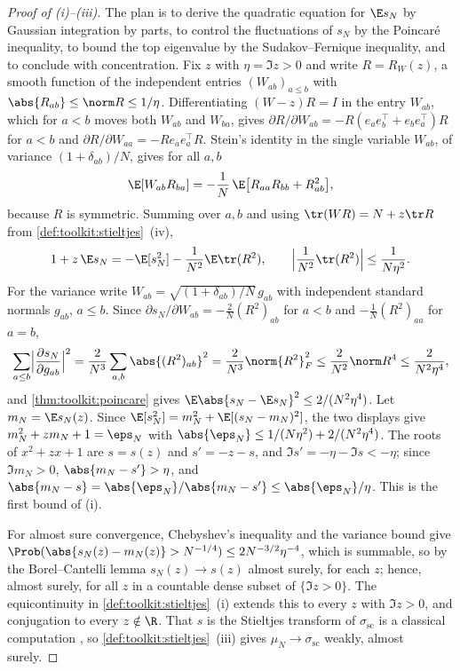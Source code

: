 \begin{refsection}
\begin{proof}[Proof of (i)--(iii)]
The plan is to derive the quadratic equation for $\E s_N$ by Gaussian integration by parts, to control the fluctuations of $s_N$ by the Poincaré inequality, to bound the top eigenvalue by the Sudakov--Fernique inequality, and to conclude with concentration. Fix $z$ with $\eta=\Im z>0$ and write $R=R_W(z)$, a smooth function of the independent entries $(W_{ab})_{a\le b}$ with $\abs{R_{ab}}\le\norm R\le1/\eta$. Differentiating $(W-z)R=I$ in the entry $W_{ab}$, which for $a<b$ moves both $W_{ab}$ and $W_{ba}$, gives $\partial R/\partial W_{ab}=-R(e_ae_b^\top+e_be_a^\top)R$ for $a<b$ and $\partial R/\partial W_{aa}=-Re_ae_a^\top R$. Stein's identity in the single variable $W_{ab}$, of variance $(1+\delta_{ab})/N$, gives for all $a,b$
\[
\E[W_{ab}R_{ba}]=-\frac1N\,\E\bigl[R_{aa}R_{bb}+R_{ab}^2\bigr],
\]
because $R$ is symmetric. Summing over $a,b$ and using $\tr(WR)=N+z\tr R$ from \cref{def:toolkit:stieltjes}~(iv),
\[
1+z\,\E s_N=-\E[s_N^2]-\frac1{N^2}\E\tr(R^2),\qquad\Bigl\lvert\frac1{N^2}\tr(R^2)\Bigr\rvert\le\frac1{N\eta^2}.
\]
For the variance write $W_{ab}=\sqrt{(1+\delta_{ab})/N}\,g_{ab}$ with independent standard normals $g_{ab}$, $a\le b$. Since $\partial s_N/\partial W_{ab}=-\frac2N(R^2)_{ab}$ for $a<b$ and $-\frac1N(R^2)_{aa}$ for $a=b$,
\[
\sum_{a\le b}\Bigl\lvert\frac{\partial s_N}{\partial g_{ab}}\Bigr\rvert^2=\frac2{N^3}\sum_{a,b}\abs{(R^2)_{ab}}^2=\frac2{N^3}\norm{R^2}_F^2\le\frac2{N^2}\norm R^4\le\frac2{N^2\eta^4},
\]
and \cref{thm:toolkit:poincare} gives $\E\abs{s_N-\E s_N}^2\le2/(N^2\eta^4)$. Let $m_N=\E s_N(z)$. Since $\E[s_N^2]=m_N^2+\E[(s_N-m_N)^2]$, the two displays give $m_N^2+zm_N+1=\eps_N$ with $\abs{\eps_N}\le1/(N\eta^2)+2/(N^2\eta^4)$. The roots of $x^2+zx+1$ are $s=s(z)$ and $s'=-z-s$, and $\Im s'=-\eta-\Im s<-\eta$; since $\Im m_N>0$, $\abs{m_N-s'}>\eta$, and $\abs{m_N-s}=\abs{\eps_N}/\abs{m_N-s'}\le\abs{\eps_N}/\eta$. This is the first bound of (i).

For almost sure convergence, Chebyshev's inequality and the variance bound give $\Prob(\abs{s_N(z)-m_N(z)}>N^{-1/4})\le2N^{-3/2}\eta^{-4}$, which is summable, so by the Borel--Cantelli lemma $s_N(z)\to s(z)$ almost surely, for each $z$; hence, almost surely, for all $z$ in a countable dense subset of $\{\Im z>0\}$. The equicontinuity in \cref{def:toolkit:stieltjes}~(i) extends this to every $z$ with $\Im z>0$, and conjugation to every $z\notin\R$. That $s$ is the Stieltjes transform of $\sigma_{\mathrm{sc}}$ is a classical computation \parencite[Section~2.4.1]{AndersonGuionnetZeitouni2010}, so \cref{def:toolkit:stieltjes}~(iii) gives $\mu_N\to\sigma_{\mathrm{sc}}$ weakly, almost surely.


\end{proof}
\end{refsection}
